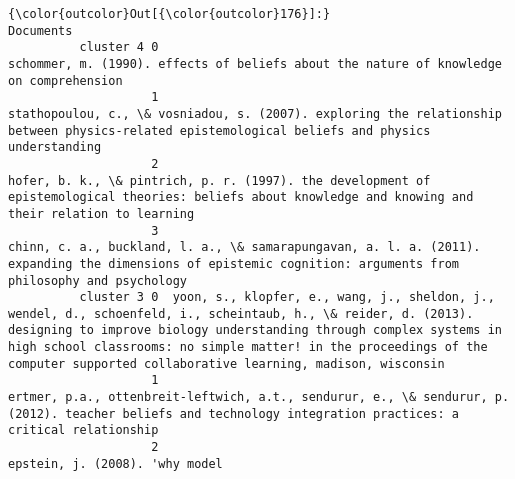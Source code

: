 \documentclass[journal,twocolumn]{IEEEtran}
\begin{document}
\begin{Verbatim}[commandchars=\\\{\}]
{\color{outcolor}Out[{\color{outcolor}176}]:}                                                                                                                                                                                                                                                                                                                           Documents
          cluster 4 0                                                                                                                                                                                                                                  schommer, m. (1990). effects of beliefs about the nature of knowledge on comprehension
                    1                                                                                                                                                                          stathopoulou, c., \& vosniadou, s. (2007). exploring the relationship between physics-related epistemological beliefs and physics understanding
                    2                                                                                                                                                                 hofer, b. k., \& pintrich, p. r. (1997). the development of epistemological theories: beliefs about knowledge and knowing and their relation to learning
                    3                                                                                                                                                             chinn, c. a., buckland, l. a., \& samarapungavan, a. l. a. (2011). expanding the dimensions of epistemic cognition: arguments from philosophy and psychology
          cluster 3 0  yoon, s., klopfer, e., wang, j., sheldon, j., wendel, d., schoenfeld, i., scheintaub, h., \& reider, d. (2013). designing to improve biology understanding through complex systems in high school classrooms: no simple matter! in the proceedings of the computer supported collaborative learning, madison, wisconsin
                    1                                                                                                                                                             ertmer, p.a., ottenbreit-leftwich, a.t., sendurur, e., \& sendurur, p. (2012). teacher beliefs and technology integration practices: a critical relationship
                    2                                                                                                                                                                                                                                                                                          epstein, j. (2008). 'why model

\end{Verbatim}
\end{document}

